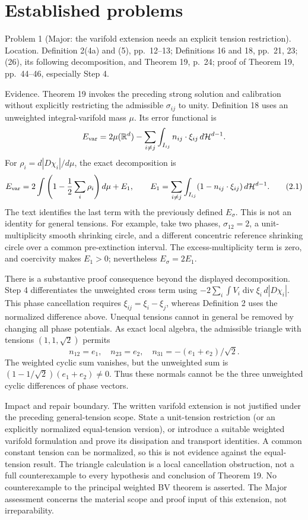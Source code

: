 \documentclass[10pt]{article}
\begin{document}
\section*{Established problems}
Problem 1 (Major: the varifold extension needs an explicit tension restriction).  Location. Definition 2(4a) and (5), pp. 12–13; Definitions 16 and 18, pp. 21, 23; (26), its following decomposition, and Theorem 19, p. 24; proof of Theorem 19, pp. 44–46, especially Step 4.\par
Evidence. Theorem 19 invokes the preceding strong solution and calibration without explicitly restricting the admissible \(\sigma_{ij}\) to unity. Definition 18 uses an unweighted integral-varifold mass \(\mu\). Its error functional is \[E_{\rm var}=2\mu(\mathbb R^d)-\sum_{i\ne j}\int_{I_{ij}}n_{ij}\cdot\xi_{ij}\,d\mathcal H^{d-1}.\] For \(\rho_i=d|D\chi_i|/d\mu\), the exact decomposition is \[E_{\rm var}
 =2\int\left(1-\frac12\sum_i\rho_i\right)d\mu
   +E_1,\qquad
 E_1=\sum_{i\ne j}\int_{I_{ij}}(1-n_{ij}\cdot\xi_{ij})\,d\mathcal H^{d-1}.       \tag{2.1}\] The text identifies the last term with the previously defined \(E_\sigma\). This is not an identity for general tensions. For example, take two phases, \(\sigma_{12}=2\), a unit-multiplicity smooth shrinking circle, and a different concentric reference shrinking circle over a common pre-extinction interval. The excess-multiplicity term is zero, and coercivity makes \(E_1>0\); nevertheless \(E_\sigma=2E_1\).\par
There is a substantive proof consequence beyond the displayed decomposition. Step 4 differentiates the unweighted cross term using \(-2\sum_i\int V_i\operatorname{div}\xi_i\,d|D\chi_i|\). This phase cancellation requires \(\xi_{ij}=\xi_i-\xi_j\), whereas Definition 2 uses the normalized difference above. Unequal tensions cannot in general be removed by changing all phase potentials. As exact local algebra, the admissible triangle with tensions \((1,1,\sqrt2)\) permits \[n_{12}=e_1,\quad n_{23}=e_2,\quad
 n_{31}=-(e_1+e_2)/\sqrt2.\] The weighted cyclic sum vanishes, but the unweighted sum is \((1-1/\sqrt2)(e_1+e_2)\ne0\). Thus these normals cannot be the three unweighted cyclic differences of phase vectors.\par
Impact and repair boundary. The written varifold extension is not justified under the preceding general-tension scope. State a unit-tension restriction (or an explicitly normalized equal-tension version), or introduce a suitable weighted varifold formulation and prove its dissipation and transport identities. A common constant tension can be normalized, so this is not evidence against the equal-tension result. The triangle calculation is a local cancellation obstruction, not a full counterexample to every hypothesis and conclusion of Theorem 19. No counterexample to the principal weighted BV theorem is asserted. The Major assessment concerns the material scope and proof input of this extension, not irreparability.\par
\end{document}
